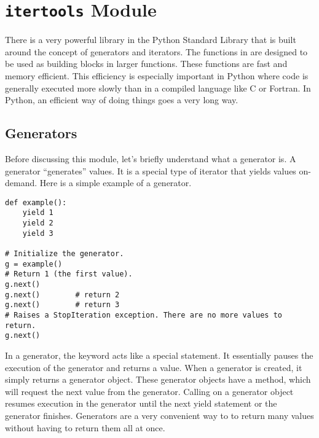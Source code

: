 \section*{\texttt{itertools} Module}
There is a very powerful library in the Python Standard Library that is built around the concept
of generators and iterators.  The functions in  are designed to be used as
building blocks in larger functions.  These functions are fast and memory efficient.
This efficiency is especially important in Python where code is generally executed more slowly than in a compiled language like C or Fortran.
In Python, an efficient way of doing things goes a very long way.

\subsection*{Generators}
Before discussing this module, let's briefly understand what a generator is.
A generator ``generates'' values.  It is a special type of iterator that yields values on-demand.  Here is a simple example of a generator.
\begin{lstlisting}
def example():
    yield 1
    yield 2
    yield 3

# Initialize the generator.
g = example()
# Return 1 (the first value).
g.next()
g.next()        # return 2
g.next()        # return 3
# Raises a StopIteration exception. There are no more values to return.
g.next()
\end{lstlisting}
In a generator, the  keyword acts like a special  statement.
It essentially pauses the execution of the generator and returns a value.
When a generator is created, it simply returns a generator object.
These generator objects have a  method, which will request the next value from the generator.
Calling  on a generator object resumes execution in the generator until the next yield statement or the generator finishes.
Generators are a very convenient way to to return many values without having to return them all at once.

